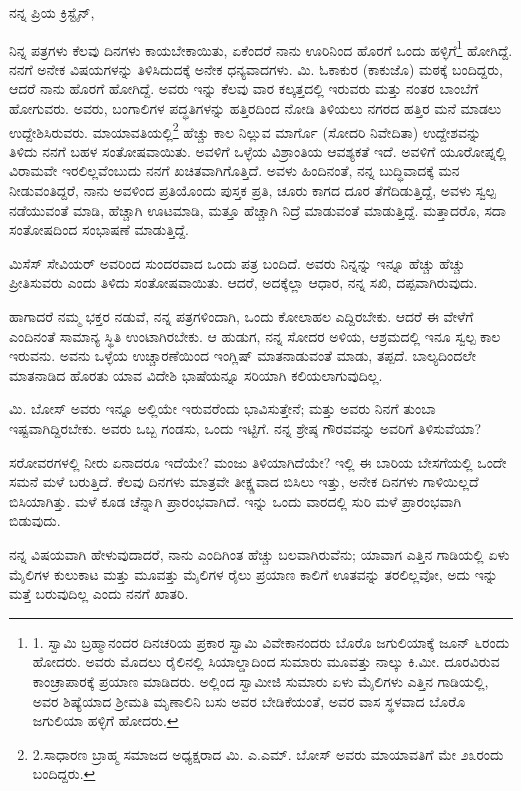 ನನ್ನ ಪ್ರಿಯ ಕ್ರಿಸ್ಟೈನ್,

ನಿನ್ನ ಪತ್ರಗಳು ಕೆಲವು ದಿನಗಳು ಕಾಯಬೇಕಾಯಿತು, ಏಕೆಂದರೆ ನಾನು ಊರಿನಿಂದ ಹೊರಗೆ ಒಂದು ಹಳ್ಳಿಗೆ\footnote{1. ಸ್ವಾಮಿ ಬ್ರಹ್ಮಾನಂದರ ದಿನಚರಿಯ ಪ್ರಕಾರ ಸ್ವಾಮಿ ವಿವೇಕಾನಂದರು ಬೊರೊ ಜಗುಲಿಯಾಕ್ಕೆ ಜೂನ್ ೬ರಂದು ಹೋದರು. ಅವರು ಮೊದಲು ರೈಲಿನಲ್ಲಿ ಸಿಯಾಲ್ಡಾದಿಂದ ಸುಮಾರು ಮೂವತ್ತು ನಾಲ್ಕು ಕಿ.ಮೀ. ದೂರವಿರುವ ಕಾಂಚ್ರಾಪಾರಕ್ಕೆ ಪ್ರಯಾಣ ಮಾಡಿದರು. ಅಲ್ಲಿಂದ ಸ್ವಾಮೀಜಿ ಸುಮಾರು ಏಳು ಮೈಲಿಗಳು ಎತ್ತಿನ ಗಾಡಿಯಲ್ಲಿ, ಅವರ ಶಿಷ್ಯೆಯಾದ ಶ‍್ರೀಮತಿ ಮೃಣಾಲಿನಿ ಬಸು ಅವರ ಬೇಡಿಕೆಯಂತೆ, ಅವರ ವಾಸ ಸ್ಥಳವಾದ ಬೊರೊ ಜಗುಲಿಯಾ ಹಳ್ಳಿಗೆ ಹೋದರು.} ಹೋಗಿದ್ದೆ. ನನಗೆ ಅನೇಕ ವಿಷಯಗಳನ್ನು ತಿಳಿಸಿದುದಕ್ಕೆ ಅನೇಕ ಧನ್ಯವಾದಗಳು. ಮಿ. ಓಕಾಕುರ (ಕಾಕುಜೊ) ಮಠಕ್ಕೆ ಬಂದಿದ್ದರು, ಆದರೆ ನಾನು ಹೊರಗೆ ಹೋಗಿದ್ದೆ. ಅವರು ಇನ್ನು ಕೆಲವು ವಾರ ಕಲ್ಕತ್ತದಲ್ಲಿ ಇರುವರು ಮತ್ತು ನಂತರ ಬಾಂಬೆಗೆ ಹೋಗುವರು. ಅವರು, ಬಂಗಾಲಿಗಳ ಪದ್ಧತಿಗಳನ್ನು ಹತ್ತಿರದಿಂದ ನೋಡಿ ತಿಳಿಯಲು ನಗರದ ಹತ್ತಿರ ಮನೆ ಮಾಡಲು ಉದ್ದೇಶಿಸಿರುವರು. ಮಾಯಾವತಿಯಲ್ಲಿ\footnote{2.ಸಾಧಾರಣ ಬ್ರಾಹ್ಮ ಸಮಾಜದ ಅಧ್ಯಕ್ಷರಾದ ಮಿ. ಎ.ಎಮ್​. ಬೋಸ್ ಅವರು ಮಾಯಾವತಿಗೆ ಮೇ ೨೩ರಂದು ಬಂದಿದ್ದರು.} ಹೆಚ್ಚು ಕಾಲ ನಿಲ್ಲುವ ಮಾರ್ಗೊ (ಸೋದರಿ ನಿವೇದಿತಾ) ಉದ್ದೇಶವನ್ನು ತಿಳಿದು ನನಗೆ ಬಹಳ ಸಂತೋಷವಾಯಿತು. ಅವಳಿಗೆ ಒಳ್ಳೆಯ ವಿಶ್ರಾಂತಿಯ ಆವಶ್ಯಕತೆ ಇದೆ. ಅವಳಿಗೆ ಯೂರೋಪ್ನಲ್ಲಿ ವಿರಾಮವೇ ಇರಲಿಲ್ಲವೆಂಬುದು ನನಗೆ ಖಚಿತವಾಗಿಗೊತ್ತಿದೆ. ಅವಳು ಹಿಂದಿನಂತೆ, ನನ್ನ ಬುದ್ಧಿವಾದಕ್ಕೆ ಮನ ನೀಡುವಂತಿದ್ದರೆ, ನಾನು ಅವಳಿಂದ ಪ್ರತಿಯೊಂದು ಪುಸ್ತಕ ಪ್ರತಿ, ಚೂರು ಕಾಗದ ದೂರ ತೆಗೆದಿಡುತ್ತಿದ್ದೆ, ಅವಳು ಸ್ವಲ್ಪ ನಡೆಯುವಂತೆ ಮಾಡಿ, ಹೆಚ್ಚಾಗಿ ಊಟಮಾಡಿ, ಮತ್ತೂ ಹೆಚ್ಚಾಗಿ ನಿದ್ರೆ ಮಾಡುವಂತೆ ಮಾಡುತ್ತಿದ್ದೆ. ಮತ್ತಾದರೊ, ಸದಾ ಸಂತೋಷದಿಂದ ಸಂಭಾಷಣೆ ಮಾಡುತ್ತಿದ್ದೆ.

ಮಿಸೆಸ್ ಸೇವಿಯರ್ ಅವರಿಂದ ಸುಂದರವಾದ ಒಂದು ಪತ್ರ ಬಂದಿದೆ. ಅವರು ನಿನ್ನನ್ನು ಇನ್ನೂ ಹೆಚ್ಚು ಹೆಚ್ಚು ಪ್ರೀತಿಸುವರು ಎಂದು ತಿಳಿದು ಸಂತೋಷವಾಯಿತು. ಆದರೆ, ಅದಕ್ಕೆಲ್ಲಾ ಆಧಾರ, ನನ್ನ ಸಖಿ, ದಪ್ಪವಾಗಿರುವುದು.

ಹಾಗಾದರೆ ನಮ್ಮ ಭಕ್ತರ ನಡುವೆ, ನನ್ನ ಪತ್ರಗಳಿಂದಾಗಿ, ಒಂದು ಕೋಲಾಹಲ ಎದ್ದಿರಬೇಕು. ಆದರೆ ಈ ವೇಳೆಗೆ ಎಂದಿನಂತೆ ಸಾಮಾನ್ಯ ಸ್ಥಿತಿ ಉಂಟಾಗಿರಬೇಕು. ಆ ಹುಡುಗ, ನನ್ನ ಸೋದರ ಅಳಿಯ, ಆಶ್ರಮದಲ್ಲಿ ಇನೂ ಸ್ವಲ್ಪ ಕಾಲ ಇರುವನು. ಅವನು ಒಳ್ಳೆಯ ಉಚ್ಚಾರಣೆಯಿಂದ ಇಂಗ್ಲಿಷ್ ಮಾತನಾಡುವಂತೆ ಮಾಡು, ತಪ್ಪದೆ. ಬಾಲ್ಯದಿಂದಲೇ ಮಾತನಾಡಿದ ಹೊರತು ಯಾವ ವಿದೇಶಿ ಭಾಷೆಯನ್ನೂ ಸರಿಯಾಗಿ ಕಲಿಯಲಾಗುವುದಿಲ್ಲ.

ಮಿ. ಬೋಸ್ ಅವರು ಇನ್ನೂ ಅಲ್ಲಿಯೇ ಇರುವರೆಂದು ಭಾವಿಸುತ್ತೇನೆ; ಮತ್ತು ಅವರು ನಿನಗೆ ತುಂಬಾ ಇಷ್ಟವಾಗಿದ್ದಿರಬೇಕು. ಅವರು ಒಬ್ಬ ಗಂಡಸು, ಒಂದು ಇಟ್ಟಿಗೆ. ನನ್ನ ಶ್ರೇಷ್ಠ ಗೌರವವನ್ನು ಅವರಿಗೆ ತಿಳಿಸುವೆಯಾ?

ಸರೋವರಗಳಲ್ಲಿ ನೀರು ಏನಾದರೂ ಇದೆಯೇ? ಮಂಜು ತಿಳಿಯಾಗಿದೆಯೇ? ಇಲ್ಲಿ ಈ ಬಾರಿಯ ಬೇಸಗೆಯಲ್ಲಿ ಒಂದೇ ಸಮನೆ ಮಳೆ ಬರುತ್ತಿದೆ. ಕೆಲವು ದಿನಗಳು ಮಾತ್ರವೇ ತೀಕ್ಷ್ಣವಾದ ಬಿಸಿಲು ಇತ್ತು, ಅನೇಕ ದಿನಗಳು ಗಾಳಿಯಿಲ್ಲದೆ ಬಿಸಿಯಾಗಿತ್ತು. ಮಳೆ ಕೂಡ ಚೆನ್ನಾಗಿ ಪ್ರಾರಂಭವಾಗಿದೆ. ಇನ್ನು ಒಂದು ವಾರದಲ್ಲಿ ಸುರಿ ಮಳೆ ಪ್ರಾರಂಭವಾಗಿ ಬಿಡುವುದು.

ನನ್ನ ವಿಷಯವಾಗಿ ಹೇಳುವುದಾದರೆ, ನಾನು ಎಂದಿಗಿಂತ ಹೆಚ್ಚು ಬಲವಾಗಿರುವೆನು; ಯಾವಾಗ ಎತ್ತಿನ ಗಾಡಿಯಲ್ಲಿ ಏಳು ಮೈಲಿಗಳ ಕುಲುಕಾಟ ಮತ್ತು ಮೂವತ್ತು ಮೈಲಿಗಳ ರೈಲು ಪ್ರಯಾಣ ಕಾಲಿಗೆ ಊತವನ್ನು ತರಲಿಲ್ಲವೋ, ಅದು ಇನ್ನು ಮತ್ತೆ ಬರುವುದಿಲ್ಲ ಎಂದು ನನಗೆ ಖಾತರಿ.

